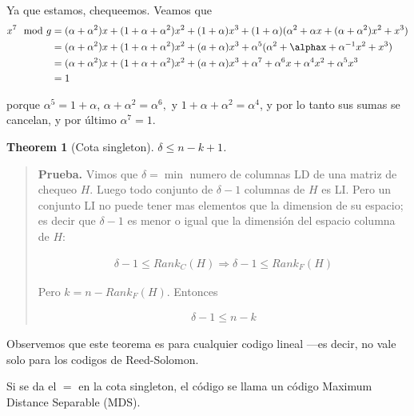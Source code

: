 \documentclass[a4paper]{article}
\newtheorem{theorem}{Theorem}
\newtheorem{theorem}{Theorem}
\begin{document}
Ya que estamos, chequeemos. Veamos que 
\begin{align*}
    x^7 \mod g &= (\alpha + \alpha^2) x + (1 + \alpha + \alpha^2) x^2 + (1 + \alpha)x^3 + (1 + \alpha)(\alpha^2 + \alpha x + (\alpha + \alpha^2)x^2 + x^3) \\ 
               &= (\alpha + \alpha^2 ) x + (1 + \alpha + \alpha^2) x^2 + (a + \alpha)x^3 + \alpha^5(\alpha^2 + \alphax + \alpha^{-1} x^2 + x^3) \\ 
               &= (\alpha + \alpha^2 ) x + (1 + \alpha + \alpha^2) x^2 + (a + \alpha)x^3 + \alpha^7 + \alpha^6x + \alpha^4x^2 + \alpha^5 x^3\\ 
               &= 1
\end{align*}

porque $\alpha^5 = 1 + \alpha$, $\alpha + \alpha^2 = \alpha^6,$ y $1 + \alpha + \alpha^2 = \alpha^4$, y por 
lo tanto sus sumas se cancelan, y por último $\alpha^7 = 1$.

\begin{theorem}[Cota singleton]
    $\delta \leq n - k + 1$.
\end{theorem}


\small
\begin{quote}

    \textbf{Prueba.} Vimos que $\delta = \min$ numero de columnas LD de una
    matriz de chequeo $H$. Luego todo conjunto de $\delta - 1$ columnas de $H$
    es LI. Pero un conjunto LI no puede tener mas elementos que la dimension 
    de su espacio; es decir que $\delta - 1$ es menor o igual que la dimensión 
    del espacio columna de $H$:

    \begin{align*}
        \delta - 1 \leq Rank_C(H) \Rightarrow \delta - 1 \leq Rank_F(H)
    \end{align*}

    Pero $k = n - Rank_F(H)$. Entonces 

    \begin{align*}
        \delta - 1 \leq n -k
    \end{align*}

\end{quote}
\normalsize

Observemos que este teorema es para cualquier codigo lineal ---es decir, no vale solo 
para los codigos de Reed-Solomon.

\begin{definition}
    Si se da el $=$ en la cota singleton, el código se llama un código Maximum
    Distance Separable (MDS).
\end{definition}
\end{document}
